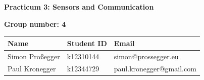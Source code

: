 \documentclass[11pt,a4paper]{article}
\begin{document}
\begin{center}
	{\LARGE \bfseries Practicum 3: Sensors and Communication}
\end{center}

\vspace{0.5cm}
\textbf{Group number: 4}

\begin{table}[h]
	\centering
	\begin{tabularx}{\textwidth}{|X|X|X|}
		\hline
		\centering \textbf{Name} & \centering \textbf{Student ID} & \centering \textbf{Email} \tabularnewline \hline
		Simon Proßegger          & k12310144                      & simon@prossegger.eu \tabularnewline \hline
		Paul Kronegger           & k12344729                      & paul.kronegger@gmail.com \tabularnewline \hline
	\end{tabularx}
\end{table}






\end{document}
